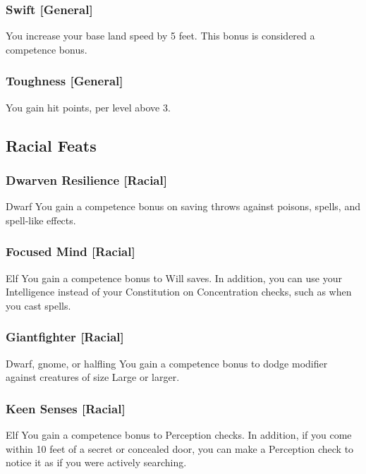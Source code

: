 \subsubsection{Swift [General]}
 You increase your base land speed by 5 feet. This bonus is considered a competence bonus.

\subsubsection{Toughness [General]}
 You gain  hit points,  per level above 3.

\subsection{Racial Feats}

\subsubsection{Dwarven Resilience [Racial]}
 Dwarf
 You gain a  competence bonus on saving throws against poisons, spells, and spell-like effects.

\subsubsection{Focused Mind [Racial]}
 Elf
 You gain a  competence bonus to Will saves. In addition, you can use your Intelligence instead of your Constitution on Concentration checks, such as when you cast spells.

\subsubsection{Giantfighter [Racial]}
 Dwarf, gnome, or halfling
 You gain a  competence bonus to dodge modifier against creatures of size Large or larger.

\subsubsection{Keen Senses [Racial]}
 Elf
 You gain a  competence bonus to Perception checks. In addition, if you come within 10 feet of a secret or concealed door, you can make a Perception check to notice it as if you were actively searching.

